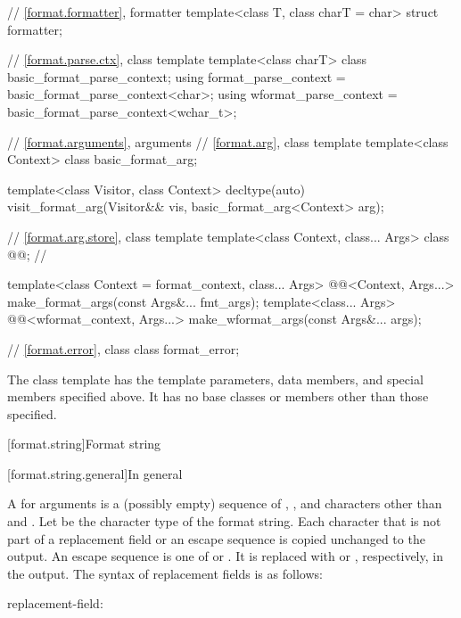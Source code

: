 \begin{codeblock}
{  // \ref{format.formatter}, formatter
  template<class T, class charT = char> struct formatter;

  // \ref{format.parse.ctx}, class template 
  template<class charT> class basic_format_parse_context;
  using format_parse_context = basic_format_parse_context<char>;
  using wformat_parse_context = basic_format_parse_context<wchar_t>;

  // \ref{format.arguments}, arguments
  // \ref{format.arg}, class template 
  template<class Context> class basic_format_arg;

  template<class Visitor, class Context>
    decltype(auto) visit_format_arg(Visitor&& vis, basic_format_arg<Context> arg);

  // \ref{format.arg.store}, class template 
  template<class Context, class... Args> class @@;       // \expos

  template<class Context = format_context, class... Args>
    @@<Context, Args...>
      make_format_args(const Args&... fmt_args);
  template<class... Args>
    @@<wformat_context, Args...>
      make_wformat_args(const Args&... args);

  // \ref{format.error}, class 
  class format_error;
}
\end{codeblock}


\pnum
The class template 
has the template parameters, data members, and special members specified above. It has no base classes or members other than those specified.

[format.string]{Format string}

[format.string.general]{In general}

\newcommand{\fmtnontermdef}[1]{{\BnfNontermshape#1\itcorr}\textnormal{:}}
\newcommand{\fmtgrammarterm}[1]{\gterm{#1}}

\pnum
A  for arguments  is
a (possibly empty) sequence of
,
,
and characters other than \noncxxtcode{\{} and \noncxxtcode{\}}.
Let  be the character type of the format string.
Each character that is not part of
a replacement field or an escape sequence
is copied unchanged to the output.
An escape sequence is one of \noncxxtcode{\{\{} or \noncxxtcode{\}\}}.
It is replaced with \noncxxtcode{\{} or \noncxxtcode{\}}, respectively, in the output.
The syntax of replacement fields is as follows:
\begin{ncbnf}
\fmtnontermdef{replacement-field}\br
    \noncxxterminal{\{}   \noncxxterminal{\}}
\end{ncbnf}

